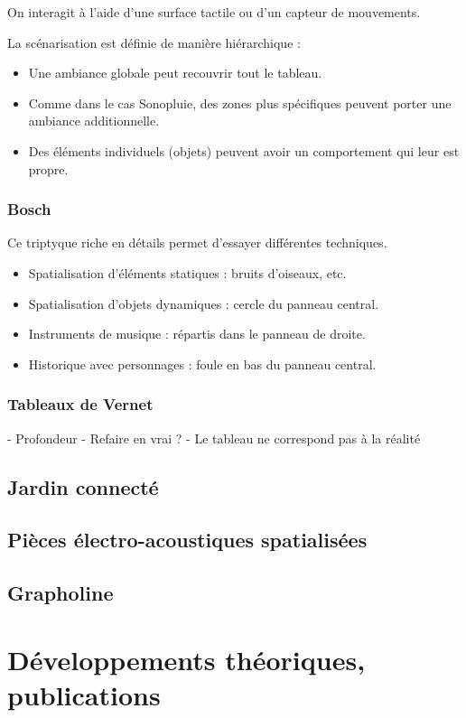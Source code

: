 \documentclass[french,a4paper,openany,12pt]{book}
\begin{document}
On interagit à l'aide d'une surface tactile ou d'un capteur de mouvements.

La scénarisation est définie de manière hiérarchique :
\begin{itemize}
    \item Une ambiance globale peut recouvrir tout le tableau.
    \item Comme dans le cas Sonopluie, des zones plus spécifiques peuvent porter une ambiance additionnelle.
    \item Des éléments individuels (objets) peuvent avoir un comportement qui leur est propre.
\end{itemize} 

\subsubsection{Bosch}
Ce triptyque riche en détails permet d'essayer différentes techniques.
\begin{itemize}
\item Spatialisation d'éléments statiques : bruits d'oiseaux, etc.
\item Spatialisation d'objets dynamiques : cercle du panneau central.
\item Instruments de musique : répartis dans le panneau de droite.
\item Historique avec personnages : foule en bas du panneau central.
\end{itemize}

\subsubsection{Tableaux de Vernet}
- Profondeur
- Refaire en vrai ? 
- Le tableau ne correspond pas à la réalité

\subsection{Jardin connecté}

\subsection{Pièces électro-acoustiques spatialisées}

\subsection{Grapholine}

\section{Développements théoriques, publications}
\end{document}
